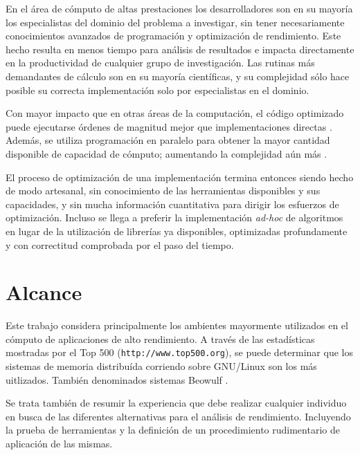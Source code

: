 \documentclass[a4paper]{report}
\begin{document}
En el \'area de c\'omputo de altas prestaciones los desarrolladores son en su
mayor\'ia los especialistas del dominio del problema a investigar, sin tener
necesariamente conocimientos avanzados de programaci\'on y optimizaci\'on de
rendimiento. Este hecho resulta en menos tiempo para an\'alisis de resultados
e impacta directamente en la productividad de cualquier grupo de
investigaci\'on. Las rutinas m\'as demandantes de c\'alculo son en su
mayor\'ia cient\'ificas, y su complejidad s\'olo hace posible su correcta
implementaci\'on solo por especialistas en el dominio.

\bigskip

Con mayor impacto que en otras \'areas de la computaci\'on, el c\'odigo
optimizado puede ejecutarse \'ordenes de magnitud mejor que implementaciones
directas \cite{mm-matrixmultiplicationtool}. Adem\'as, se utiliza
programaci\'on en paralelo para obtener la mayor cantidad disponible de
capacidad de c\'omputo; aumentando la complejidad a\'un m\'as
\cite{parallel-programming}.

\bigskip

El proceso de optimizaci\'on de una implementaci\'on termina entonces siendo
hecho de modo artesanal, sin conocimiento de las herramientas disponibles y
sus capacidades, y sin mucha informaci\'on cuantitativa para dirigir los
esfuerzos de optimizaci\'on. Incluso se llega a preferir la implementaci\'on
{\em ad-hoc} de algoritmos en lugar de la utilizaci\'on de librer\'ias ya
disponibles, optimizadas profundamente y con correctitud comprobada por el
paso del tiempo.

\section{Alcance}

Este trabajo considera principalmente los ambientes mayormente utilizados en
el c\'omputo de aplicaciones de alto rendimiento. A trav\'es de las
estad\'isticas mostradas por el Top 500 ({\tt http://www.top500.org}), se
puede determinar que los sistemas de memoria distribu\'ida corriendo sobre
GNU/Linux son los m\'as uitlizados. Tambi\'en denominados sistemas Beowulf
\cite{beowulf}.

\bigskip

Se trata tambi\'en de resumir la experiencia que debe realizar cualquier
individuo en busca de las diferentes alternativas para el an\'alisis de
rendimiento. Incluyendo la prueba de herramientas y la definici\'on de un
procedimiento rudimentario de aplicaci\'on de las mismas.
\end{document}
